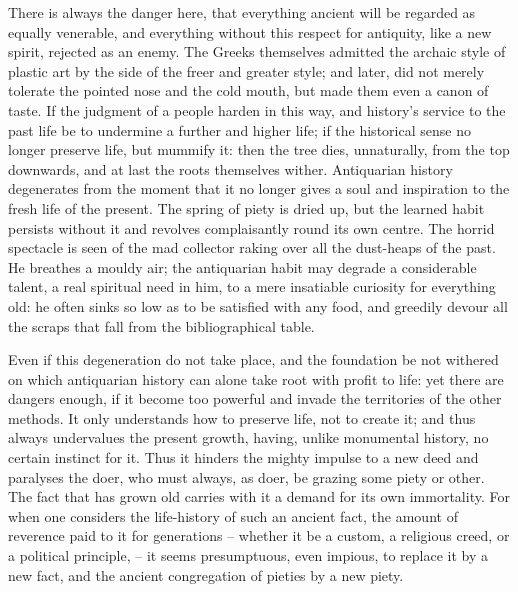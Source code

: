 There is always the danger here, that everything ancient will be
regarded as equally venerable, and everything without this respect
for antiquity, like a new spirit, rejected as an enemy. The Greeks
themselves admitted the archaic style of plastic art by the side of
the freer and greater style; and later, did not merely tolerate the
pointed nose and the cold mouth, but made them even a canon of taste.
If the judgment of a people harden in this way, and history's service
to the past life be to undermine a further and higher life; if the
historical sense no longer preserve life, but mummify it: then the
tree dies, unnaturally, from the top downwards, and at last the roots
themselves wither. Antiquarian history degenerates from the moment
that it no longer gives a soul and inspiration to the fresh life of
the present. The spring of piety is dried up, but the learned habit
persists without it and revolves complaisantly round its own centre.
The horrid spectacle is seen of the mad collector raking over all the
dust-heaps of the past. He breathes a mouldy air; the antiquarian
habit may degrade a considerable talent, a real spiritual need in
him, to a mere insatiable curiosity for everything old: he often
sinks so low as to be satisfied with any food, and greedily devour
all the scraps that fall from the bibliographical table.

Even if this degeneration do not take place, and the foundation be
not withered on which antiquarian history can alone take root with
profit to life: yet there are dangers enough, if it become too
powerful and invade the territories of the other methods. It only
understands how to preserve life, not to create it; and thus always
undervalues the present growth, having, unlike monumental history, no
certain instinct for it. Thus it hinders the mighty impulse to a new
deed and paralyses the doer, who must always, as doer, be grazing
some piety or other. The fact that has grown old carries with it a
demand for its own immortality. For when one considers the
life-history of such an ancient fact, the amount of reverence paid to
it for generations -- whether it be a custom, a religious creed, or a
political principle, -- it seems presumptuous, even impious, to replace
it by a new fact, and the ancient congregation of pieties by a new
piety.

